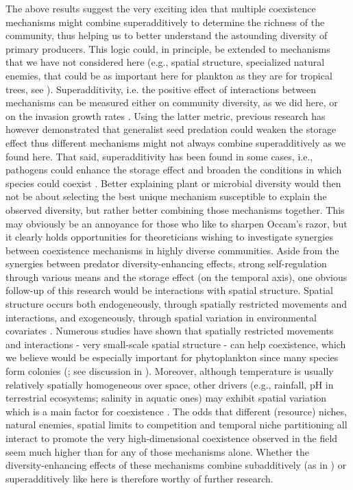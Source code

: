 \documentclass[a4paper,12pt]{article}
\begin{document}
The above results suggest the very exciting idea that multiple coexistence
mechanisms might combine superadditively to determine the richness
of the community, thus helping us to better understand the astounding
diversity of primary producers. This logic could, in principle, be
extended to mechanisms that we have not considered here (e.g., spatial
structure, specialized natural enemies, that could be as important
here for plankton as they are for tropical trees, see \citealp{bagchi_pathogens_2014,comita_testing_2014,barraquand2018coastal}).
Superadditivity, i.e. the positive effect of interactions between
mechanisms can be measured either on community diversity, as we did
here, or on the invasion growth rates \citep{ellner_expanded_2019}.
Using the latter metric, previous research has however demonstrated
that generalist seed predation could weaken the storage effect \citep{kuang_coexistence_2009,kuang_interacting_2010}
thus different mechanisms might not always combine superadditively
as we found here. That said, superadditivity has been found in some
cases, i.e., pathogens could enhance the storage effect and broaden
the conditions in which species could coexist \citep{mordecai_pathogen_2015}.
Better explaining plant or microbial diversity would then not be about
selecting the best unique mechanism susceptible to explain the observed
diversity, but rather better combining those mechanisms together.
This may obviously be an annoyance for those who like to sharpen Occam's
razor, but it clearly holds opportunities for theoreticians wishing
to investigate synergies between coexistence mechanisms in highly
diverse communities. Aside from the synergies between predator diversity-enhancing
effects, strong self-regulation through various means and the storage
effect (on the temporal axis), one obvious follow-up of this research
would be interactions with spatial structure. Spatial structure occurs
both endogeneously, through spatially restricted movements and interactions,
and exogeneously, through spatial variation in environmental covariates
\citep{bolker_combining_2003}. Numerous studies \citep[e.g.,][]{bolker_spatial_1999,murrell_2002}
have shown that spatially restricted movements and interactions -
very small-scale spatial structure - can help coexistence, which we
believe would be especially important for phytoplankton since many
species form colonies (\citealp{reynolds2006ecology}; see discussion
in \citealp{barraquand2018coastal}). Moreover, although temperature
is usually relatively spatially homogeneous over space, other drivers
(e.g., rainfall, pH in terrestrial ecosystems; salinity in aquatic
ones) may exhibit spatial variation which is a main factor for coexistence
\citep{snyder_when_2008}. The odds that different (resource) niches,
natural enemies, spatial limits to competition and temporal niche
partitioning all interact to promote the very high-dimensional coexistence
observed in the field seem much higher than for any of those mechanisms
alone. Whether the diversity-enhancing effects of these mechanisms
combine subadditively (as in \citealp{kuang_interacting_2010}) or
superadditively like here is therefore worthy of further research.
\end{document}
